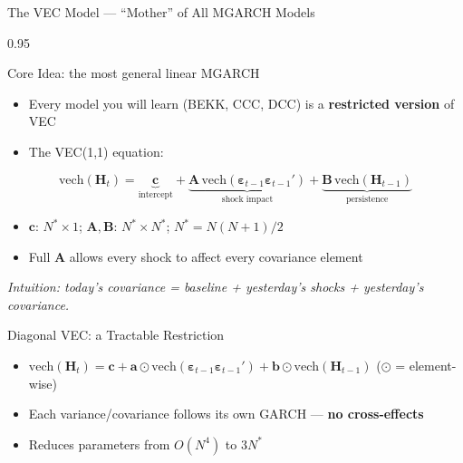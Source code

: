 \documentclass[9pt, aspectratio=169, t]{beamer}
\begin{document}
\begin{frame}{The VEC Model --- ``Mother'' of All MGARCH Models}
    \begin{cminipage}{0.95\textwidth}
    {\footnotesize
    \begin{block}{\textcolor{MainBlue}{Core Idea}: the most general linear MGARCH}
        \begin{itemize}\setlength{\itemsep}{0pt}
            \item Every model you will learn (BEKK, CCC, DCC) is a \textbf{restricted version} of VEC
            \item The VEC(1,1) equation:
        \end{itemize}
        \vspace{-2mm}
        \[
            \text{vech}(\mathbf{H}_t) = \underbrace{\mathbf{c}}_{\text{intercept}} + \underbrace{\mathbf{A}\,\text{vech}(\boldsymbol{\varepsilon}_{t-1}\boldsymbol{\varepsilon}_{t-1}')}_{\text{shock impact}} + \underbrace{\mathbf{B}\,\text{vech}(\mathbf{H}_{t-1})}_{\text{persistence}}
        \]
        \vspace{-2mm}
        \begin{itemize}\setlength{\itemsep}{0pt}
            \item $\mathbf{c}$: $N^* \times 1$; $\mathbf{A}, \mathbf{B}$: $N^* \times N^*$; $N^* = N(N+1)/2$
            \item Full $\mathbf{A}$ allows every shock to affect every covariance element
        \end{itemize}
        \textit{Intuition: today's covariance = baseline + yesterday's shocks + yesterday's covariance.}
    \end{block}
    \vspace{0.1cm}
    \begin{block}{Diagonal VEC: a Tractable Restriction}
        \begin{itemize}\setlength{\itemsep}{0pt}
            \item $\text{vech}(\mathbf{H}_t) = \mathbf{c} + \mathbf{a} \odot \text{vech}(\boldsymbol{\varepsilon}_{t-1}\boldsymbol{\varepsilon}_{t-1}') + \mathbf{b} \odot \text{vech}(\mathbf{H}_{t-1})$ \quad ($\odot$ = element-wise)
            \item Each variance/covariance follows its own GARCH --- \textbf{no cross-effects}
            \item Reduces parameters from $O(N^4)$ to $3N^*$
        \end{itemize}
    \end{block}
    }
    \end{cminipage}
\end{frame}
\end{document}

